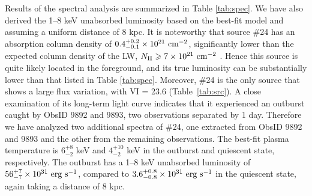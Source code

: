 \documentclass[fleqn,usenatbib]{mnras}
\begin{document}

Results of the spectral analysis are summarized in Table \ref{tab:spec}. We have also derived the 1--8 keV unabsorbed luminosity based on the best-fit model and assuming a uniform distance of 8 kpc. 
It is noteworthy that source \#24 has an absorption column density of $0.4^{+0.2}_{-0.1}\times10^{21}{\rm~cm^{-2}}$, significantly lower than the expected column density of the LW, $N_{\rm H} \geq 7\times10^{21}{\rm~cm^{-2}}$ \citep{2011MNRAS.414..495R}. Hence 
this source is quite likely located in the foreground, and its true luminosity can be substantially lower than that listed in Table \ref{tab:spec}. 
Moreover, \#24 is the only source that shows a large flux variation, with VI = 23.6 (Table~\ref{tab:src}). A close examination of its long-term light curve indicates that it experienced an outburst caught by ObsID 9892 and 9893, two observations separated by 1 day. Therefore we have analyzed two additional spectra of \#24, one extracted from ObsID 9892 and 9893 and the other from the remaining observations. 
The best-fit plasma temperature is $6_{-2}^{+8}$ keV and $4_{-2}^{+10}$ keV in the outburst and quiescent state, respectively. 
The outburst has a 1--8 keV unabsorbed luminosity of $56^{+7}_{-7}\times10^{31}{\rm~erg~s^{-1}}$, compared to $3.6^{+0.8}_{-0.8}\times10^{31}{\rm~erg~s^{-1}}$ in the quiescent state, again taking a distance of 8 kpc.
\end{document}
